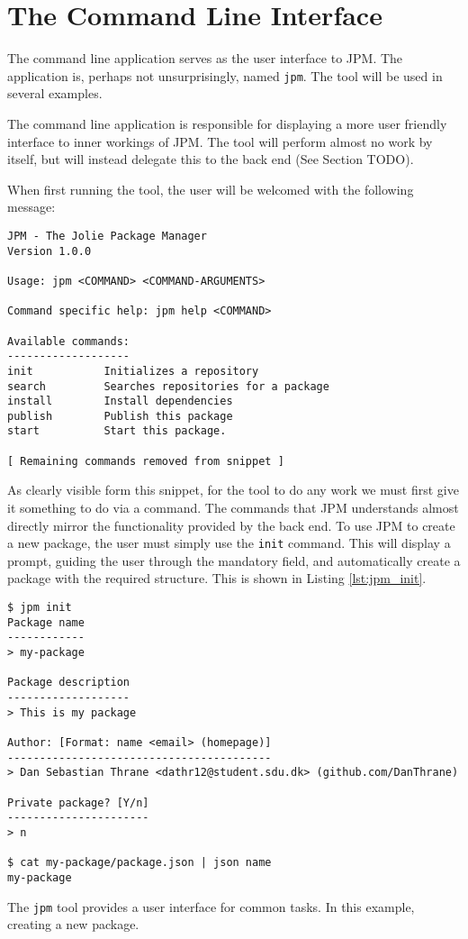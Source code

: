\section{The Command Line Interface}
\label{sec:cli}

The command line application serves as the user interface to JPM. The
application is, perhaps not unsurprisingly, named \texttt{jpm}. The
tool will be used in several examples.

The command line application is responsible for displaying a more user friendly
interface to inner workings of JPM. The tool will perform almost no work by
itself, but will instead delegate this to the back end (See Section TODO).

When first running the tool, the user will be welcomed with the following
message:

\begin{verbatim}
JPM - The Jolie Package Manager
Version 1.0.0

Usage: jpm <COMMAND> <COMMAND-ARGUMENTS>

Command specific help: jpm help <COMMAND>

Available commands:
-------------------
init           Initializes a repository
search         Searches repositories for a package
install        Install dependencies
publish        Publish this package
start          Start this package.

[ Remaining commands removed from snippet ]
\end{verbatim}

As clearly visible form this snippet, for the tool to do any work we must first
give it something to do via a command. The commands that JPM understands almost
directly mirror the functionality provided by the back end. To use JPM to
create a new package, the user must simply use the \texttt{init}
command. This will display a prompt, guiding the user through the mandatory
field, and automatically create a package with the required structure. This
is shown in Listing \ref{lst:jpm_init}.

\begin{listing}[H]
\begin{verbatim}
$ jpm init
Package name
------------
> my-package

Package description
-------------------
> This is my package

Author: [Format: name <email> (homepage)]
-----------------------------------------
> Dan Sebastian Thrane <dathr12@student.sdu.dk> (github.com/DanThrane)

Private package? [Y/n]
----------------------
> n

$ cat my-package/package.json | json name
my-package
\end{verbatim}

\caption{The \texttt{jpm} tool provides a user interface for common
    tasks. In this example, creating a new package.}

\label{lst:jpm_init}

\end{listing}

